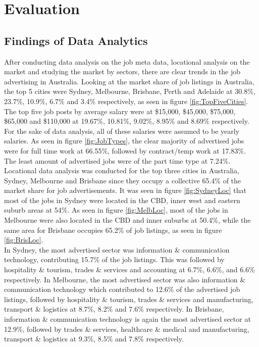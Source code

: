 \documentclass[twoside, 12pt, a4paper]{article}
\begin{document}
\newpage
\section{Evaluation}
\subsection{Findings of Data Analytics}
After conducting data analysis on the job meta data, locational analysis on the market and studying the market by sectors, there are clear trends in the job advertising in Australia. Looking at the market share of job listings in Australia, the top 5 cities were Sydney, Melbourne, Brisbane, Perth and Adelaide at 30.8\%, 23.7\%, 10.9\%, 6.7\% and 3.4\% respectively, as seen in figure \ref{fig:TopFiveCities}. The top five job posts by average salary were at \$15,000, \$45,000, \$75,000, \$65,000 and \$110,000 at 19.67\%, 10.81\%, 9.02\%, 8.95\% and 8.69\% respectively. For the sake of data analysis, all of these salaries were assumed to be yearly salaries. As seen in figure \ref{fig:JobTypes}, the clear majority of advertised jobs were for full time work at 66.55\%, followed by contract/temp work at 17.83\%. The least amount of advertised jobs were of the part time type at 7.24\%.\\
Locational data analysis was conducted for the top three cities in Australia, Sydney, Melbourne and Brisbane since they occupy a collective 65.4\% of the market share for job advertisements. It was seen in figure \ref{fig:SydneyLoc} that most of the jobs in Sydney were located in the CBD, inner west and eastern suburb areas at 54\%. As seen in figure \ref{fig:MelbLoc}, most of the jobs in Melbourne were also located in the CBD and inner suburbs at 50.4\%, while the same area for Brisbane occupies 65.2\% of job listings, as seen in figure \ref{fig:BrisLoc}.\\
In Sydney, the most advertised sector was information \& communication technology, contributing 15.7\% of the job listings. This was followed by hospitality \& tourism, trades \& services and accounting at 6.7\%, 6.6\%, and 6.6\% respectively. In Melbourne, the most advertised sector was also information \& communication technology which contributed to 12.6\% of the advertised job listings, followed by hospitality \& tourism, trades \& services and manufacturing, transport \& logistics at 8.7\%, 8.2\% and 7.6\% respectively. In Brisbane, information \& communication technology is again the most advertised sector at 12.9\%, followed by trades \& services, healthcare \& medical and manufacturing, transport \& logistics at 9.3\%, 8.5\% and 7.8\% respectively.\\
\end{document}
